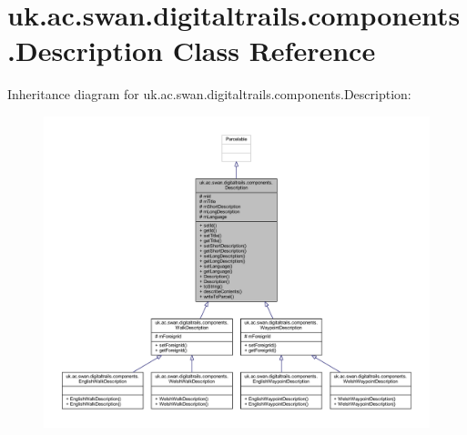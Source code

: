 \hypertarget{classuk_1_1ac_1_1swan_1_1digitaltrails_1_1components_1_1_description}{\section{uk.\+ac.\+swan.\+digitaltrails.\+components.\+Description Class Reference}
\label{classuk_1_1ac_1_1swan_1_1digitaltrails_1_1components_1_1_description}
}


Inheritance diagram for uk.\+ac.\+swan.\+digitaltrails.\+components.\+Description\+:
\nopagebreak
\begin{figure}[H]
\begin{center}
\leavevmode
\includegraphics[width=350pt]{classuk_1_1ac_1_1swan_1_1digitaltrails_1_1components_1_1_description__inherit__graph}
\end{center}
\end{figure}


